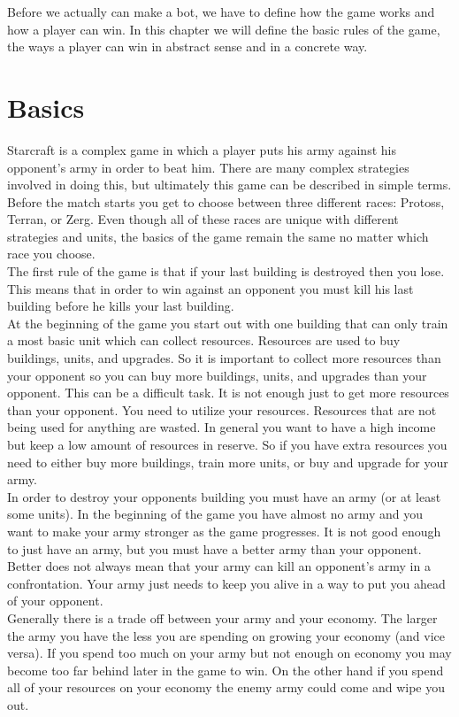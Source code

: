 Before we actually can make a bot, we have to define how the game works and how a player can win.
In this chapter we will define the basic rules of the game, the ways a player can win in abstract sense and in a concrete way.

\section{Basics}
	Starcraft is a complex game in which a player puts his army against his opponent's army in order to beat him. 
	There are many complex strategies involved in doing this, but ultimately this game can be described in simple terms.\\
	Before the match starts you get to choose between three different races: Protoss, Terran, or Zerg. 
	Even though all of these races are unique with different strategies and units, the basics of the game remain the same no matter which race you choose.\\
	The first rule of the game is that if your last building is destroyed then you lose. 
	This means that in order to win against an opponent you must kill his last building before he kills your last building. \\
	At the beginning of the game you start out with one building that can only train a most basic unit which can collect resources. 
	Resources are used to buy buildings, units, and upgrades. 
	So it is important to collect more resources than your opponent so you can buy more buildings, units, and upgrades than your opponent.
	This can be a difficult task. It is not enough just to get more resources than your opponent. 
	You need to utilize your resources. Resources that are not being used for anything are wasted. 
	In general you want to have a high income but keep a low amount of resources in reserve. 
	So if you have extra resources you need to either buy more buildings, train more units, or buy and upgrade for your army.\\
	In order to destroy your opponents building you must have an army (or at least some units). 
	In the beginning of the game you have almost no army and you want to make your army stronger as the game progresses. 
	It is not good enough to just have an army, but you must have a better army than your opponent. 
	Better does not always mean that your army can kill an opponent's army in a confrontation. 
	Your army just needs to keep you alive in a way to put you ahead of your opponent.\\
	Generally there is a trade off between your army and your economy. 
	The larger the army you have the less you are spending on growing your economy (and vice versa). 
	If you spend too much on your army but not enough on economy you may become too far behind later in the game to win. 
	On the other hand if you spend all of your resources on your economy the enemy army could come and wipe you out.\\

 